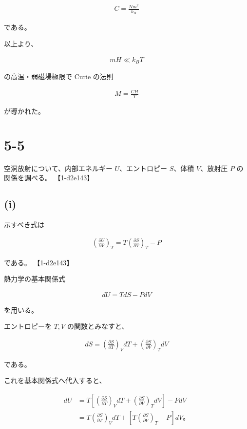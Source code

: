 \documentclass[platex,dvipdfmx,a4paper]{jsarticle}
\begin{document}
\begin{align*}
C=\frac{Nm^2}{k_B}
\end{align*}

である。

以上より、

\begin{align*}
mH
\ll
k_BT
\end{align*}

の高温・弱磁場極限で Curie の法則

\begin{align*}
M=\frac{CH}{T}
\end{align*}

が導かれた。
\section{5-5}

空洞放射について、内部エネルギー $U$、エントロピー $S$、体積 $V$、放射圧 $P$ の関係を調べる。 【1-d2e143】

\subsection{(i)}

示すべき式は

\begin{align*}
\left(
\frac{\partial U}{\partial V}
\right)_T
=
T
\left(
\frac{\partial S}{\partial V}
\right)_T
-P
\end{align*}

である。 【1-d2e143】

熱力学の基本関係式

\begin{align*}
dU
=
TdS-PdV
\end{align*}

を用いる。

エントロピーを $T,V$ の関数とみなすと、

\begin{align*}
dS
=
\left(
\frac{\partial S}{\partial T}
\right)_V dT
+
\left(
\frac{\partial S}{\partial V}
\right)_T dV
\end{align*}

である。

これを基本関係式へ代入すると、

\begin{align*}
dU
&=
T
\left[
\left(
\frac{\partial S}{\partial T}
\right)_V dT
+
\left(
\frac{\partial S}{\partial V}
\right)_T dV
\right]
-PdV \\
&=
T
\left(
\frac{\partial S}{\partial T}
\right)_V dT
+
\left[
T
\left(
\frac{\partial S}{\partial V}
\right)_T
-P
\right]dV。
\end{align*}
\end{document}
